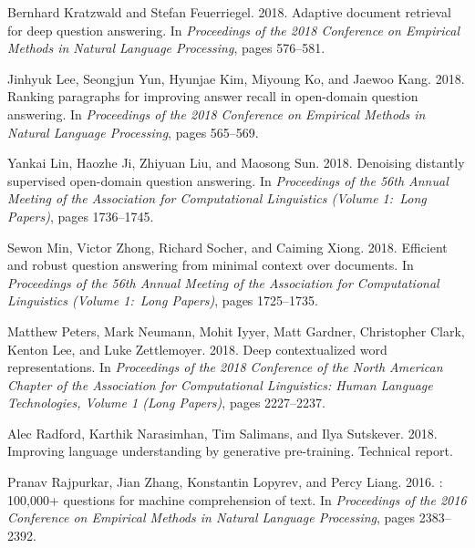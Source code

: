 \documentclass[11pt,a4paper]{article}
\begin{document}
\begin{thebibliography}{24}
Bernhard Kratzwald and Stefan Feuerriegel. 2018.
\newblock Adaptive document retrieval for deep question answering.
\newblock In \emph{Proceedings of the 2018 Conference on Empirical Methods in
  Natural Language Processing}, pages 576--581.

Jinhyuk Lee, Seongjun Yun, Hyunjae Kim, Miyoung Ko, and Jaewoo Kang. 2018.
\newblock Ranking paragraphs for improving answer recall in open-domain
  question answering.
\newblock In \emph{Proceedings of the 2018 Conference on Empirical Methods in
  Natural Language Processing}, pages 565--569.

Yankai Lin, Haozhe Ji, Zhiyuan Liu, and Maosong Sun. 2018.
\newblock Denoising distantly supervised open-domain question answering.
\newblock In \emph{Proceedings of the 56th Annual Meeting of the Association
  for Computational Linguistics (Volume 1:\ Long Papers)}, pages 1736--1745.

Sewon Min, Victor Zhong, Richard Socher, and Caiming Xiong. 2018.
\newblock Efficient and robust question answering from minimal context over
  documents.
\newblock In \emph{Proceedings of the 56th Annual Meeting of the Association
  for Computational Linguistics (Volume 1:\ Long Papers)}, pages 1725--1735.

Matthew Peters, Mark Neumann, Mohit Iyyer, Matt Gardner, Christopher Clark,
  Kenton Lee, and Luke Zettlemoyer. 2018.
\newblock Deep contextualized word representations.
\newblock In \emph{Proceedings of the 2018 Conference of the North American
  Chapter of the Association for Computational Linguistics: Human Language
  Technologies, Volume 1 (Long Papers)}, pages 2227--2237.

Alec Radford, Karthik Narasimhan, Tim Salimans, and Ilya Sutskever. 2018.
\newblock Improving language understanding by generative pre-training.
\newblock Technical report.

Pranav Rajpurkar, Jian Zhang, Konstantin Lopyrev, and Percy Liang. 2016.
: 100,000+ questions for machine comprehension of text.
\newblock In \emph{Proceedings of the 2016 Conference on Empirical Methods in
  Natural Language Processing}, pages 2383--2392.


\end{thebibliography}
\end{document}
